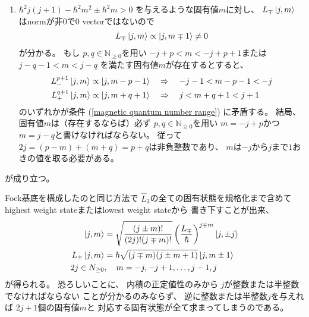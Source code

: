 \begin{enumerate}
{    }
    \item{
        $\hbar^2 j (j+1) - \hbar^2 m^2 \pm \hbar^2 m > 0$
        を与えるような固有値$m$に対し、
        $ L_\mp \ket{ j, m } $
        はnormが非0で$0$ vectorではないので
        \begin{align}
            L_\mp \ket{ j, m } \propto \ket{ j, m \mp 1 } \neq 0
        \end{align}
        が分かる。
        もし
        $p, q \in \mathbb{N}_{\ge0}$を用い
        $- j + p < m < - j + p + 1$または
        $j - q - 1 < m < j - q$
        を満たす固有値$m$が存在するとすると、
        \begin{subequations}
        \begin{align}
            L_-^{p+1} \ket{ j, m }
            \propto \ket{ j, m - p - 1}
        \quad&\Rightarrow\quad
            - j - 1 < m - p - 1 < -j
        \\
            L_+^{q+1} \ket{ j, m }
            \propto \ket{ j, m + q + 1}
        \quad&\Rightarrow\quad
            j < m + q + 1 < j + 1
        \end{align}
        \end{subequations}
        のいずれかが条件
        (\ref{magnetic quantum number range})
        に矛盾する。
        結局、固有値$m$は（存在するならば）必ず
        $p, q \in \mathbb{N}_{\ge0}$を用い
        $m = - j + p$かつ$ m = j - q$と書けなければならない。
        従って$2j = (p-m) + (m+q)
        = p+q$は非負整数であり、
        $m$は$-j$から$j$まで$1$おきの値を取る必要がある。
    }
\end{enumerate}
が成り立つ。

Fock基底を構成したのと同じ方法で
$\hat{L}_3$の全ての固有状態を規格化まで含めて
highest weight stateまたはlowest weight stateから
書き下すことが出来、
\begin{subequations}
\begin{align}
    \ket{ j, m }
    &=
    \sqrt{\dfrac{
        (j \pm m)!
    }{
        (2j)! (j \mp m)!
    }}
    \left(
        \dfrac{L_\mp}{\hbar}
    \right)^{j \mp m}
    \ket{ j, \pm j }
\\
    L_\pm \ket{ j, m }
    &= \hbar
    \sqrt{(j \mp m)(j \pm m + 1)}
    \ket{ j, m \pm 1 }
\\
    2j \in N_{\ge0}
    &,\quad
    m = - j, - j + 1, \dots, j - 1, j
\end{align}
\end{subequations}
が得られる。
恐ろしいことに、
内積の正定値性のみから
$j$が整数または半整数でなければならない
ことが分かるのみならず、
逆に整数または半整数$j$を与えれば
$2j +1$個の固有値$m$と
対応する固有状態が全て求まってしまうのである。

